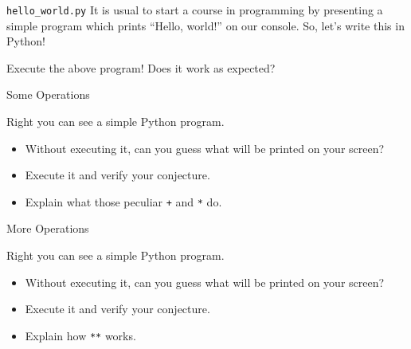 \documentclass[aspectratio=169, 12pt, xcolor=table]{beamer}
\begin{document}
	\sectionframe
	
	\begin{frame}{\texttt{hello\_world.py}}
		It is usual to start a course in programming by presenting a simple program which prints ``Hello, world!'' on our console. So, let's write this in Python!
		
		Execute the above program! Does it work as expected?
	\end{frame}

	\begin{frame}{Some Operations}
		\begin{minipage}[t]{0.5\textwidth}
			\vspace{0pt}
			Right you can see a simple Python program.
			\begin{itemize}
				\item Without executing it, can you guess what will be printed on your screen?
				\item Execute it and verify your conjecture.
				\item Explain what those peculiar \texttt{+} and \texttt{*} do.
			\end{itemize}
		\end{minipage}\hfill
		\begin{minipage}[t]{.45\textwidth}
			\vspace{0pt}
			\centering
			
		\end{minipage}	
	\end{frame}

	\begin{frame}{More Operations}
		\begin{minipage}[t]{0.5\textwidth}
			\vspace{0pt}
			Right you can see a simple Python program.
			\begin{itemize}
				\item Without executing it, can you guess what will be printed on your screen?
				\item Execute it and verify your conjecture.
				\item Explain how \texttt{**} works.
			\end{itemize}
		\end{minipage}\hfill
		\begin{minipage}[t]{.45\textwidth}
			\vspace{0pt}
			\centering
			
		\end{minipage}	
	\end{frame}
\end{document}
